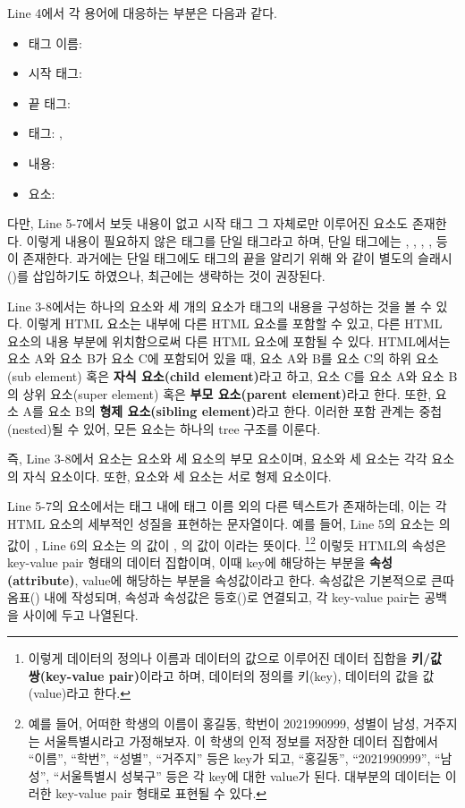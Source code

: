 Line 4에서 각 용어에 대응하는 부분은 다음과 같다.

\begin{itemize}
    \item 태그 이름: 
    \item 시작 태그: 
    \item 끝 태그: 
    \item 태그: , 
    \item 내용: 
    \item 요소: 
\end{itemize}

다만, Line 5-7에서 보듯 내용이 없고 시작 태그 그 자체로만 이루어진 요소도 존재한다. 이렇게 내용이 필요하지 않은 태그를 단일 태그라고 하며, 단일 태그에는 , , , ,  등이 존재한다. 과거에는 단일 태그에도 태그의 끝을 알리기 위해 와 같이 별도의 슬래시(\cd{/})를 삽입하기도 하였으나, 최근에는 생략하는 것이 권장된다.

Line 3-8에서는 하나의  요소와 세 개의  요소가  태그의 내용을 구성하는 것을 볼 수 있다. 이렇게 HTML 요소는 내부에 다른 HTML 요소를 포함할 수 있고, 다른 HTML 요소의 내용 부분에 위치함으로써 다른 HTML 요소에 포함될 수 있다. HTML에서는 요소 A와 요소 B가 요소 C에 포함되어 있을 때, 요소 A와 B를 요소 C의 하위 요소(sub element) 혹은 \textbf{자식 요소(child element)}라고 하고, 요소 C를 요소 A와 요소 B의 상위 요소(super element) 혹은 \textbf{부모 요소(parent element)}라고 한다. 또한, 요소 A를 요소 B의 \textbf{형제 요소(sibling element)}라고 한다. 이러한 포함 관계는 중첩(nested)될 수 있어, 모든 요소는 하나의 tree 구조를 이룬다.

즉, Line 3-8에서  요소는  요소와 세  요소의 부모 요소이며,  요소와 세  요소는 각각  요소의 자식 요소이다. 또한,  요소와 세  요소는 서로 형제 요소이다.

Line 5-7의  요소에서는 태그 내에 태그 이름 외의 다른 텍스트가 존재하는데, 이는 각 HTML 요소의 세부적인 성질을 표현하는 문자열이다. 예를 들어, Line 5의  요소는 의 값이 , Line 6의  요소는 의 값이 , 의 값이 이라는 뜻이다. \footnote{이렇게 데이터의 정의나 이름과 데이터의 값으로 이루어진 데이터 집합을 \textbf{키/값 쌍(key-value pair)}이라고 하며, 데이터의 정의를 키(key), 데이터의 값을 값(value)라고 한다.}\footnote{예를 들어, 어떠한 학생의 이름이 홍길동, 학번이 2021990999, 성별이 남성, 거주지는 서울특별시라고 가정해보자. 이 학생의 인적 정보를 저장한 데이터 집합에서 ``이름'', ``학번'', ``성별'', ``거주지'' 등은 key가 되고, ``홍길동'', ``2021990999'', ``남성'', ``서울특별시 성북구'' 등은 각 key에 대한 value가 된다. 대부분의 데이터는 이러한 key-value pair 형태로 표현될 수 있다.} 이렇듯 HTML의 속성은 key-value pair 형태의 데이터 집합이며, 이때 key에 해당하는 부분을 \textbf{속성(attribute)}, value에 해당하는 부분을 속성값이라고 한다. 속성값은 기본적으로 큰따옴표() 내에 작성되며, 속성과 속성값은 등호(\cd{=})로 연결되고, 각 key-value pair는 공백을 사이에 두고 나열된다.

